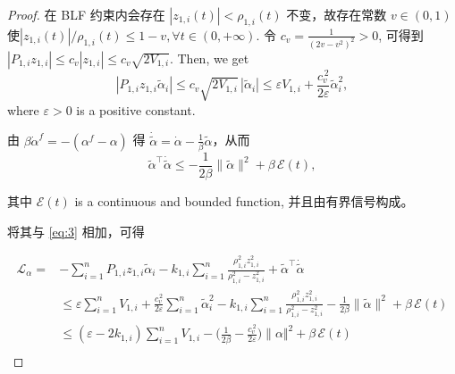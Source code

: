 \documentclass[pdflatex,sn-mathphys-num]{sn-jnl}%
\theoremstyle{thmstyleone}%
\theoremstyle{thmstyletwo}%
\theoremstyle{thmstylethree}%
\begin{document}
\begin{proof}
 
在 BLF 约束内会存在 $|z_{1,i}(t)|<\rho_{1,i}(t)$ 不变，故存在常数 $v\in(0,1)$ 使${|z_{1,i}(t)|}/{\rho_{1,i}(t)}\le 1-v, \forall t \in (0,+\infty)$. 令 $c_v=\frac{1}{(2v-v^2)^2}>0$, 可得到
$
|P_{1,i}z_{1,i}| \le c_v |z_{1,i}|\le c_v \sqrt{2V_{1,i}}
$. Then, we get
$$
|P_{1,i}z_{1,i}\tilde\alpha_i|
\le c_v\sqrt{2V_{1,i}}\,|\tilde\alpha_i|
\le \varepsilon V_{1,i}+\frac{c_v^{\,2}}{2\varepsilon}\tilde\alpha_i^2,
$$
where $\varepsilon>0$ is a positive constant.

由 $\beta\dot\alpha^f=-(\alpha^f-\alpha)$ 得 $\dot{\tilde\alpha}=\dot\alpha-\tfrac{1}{\beta}\tilde\alpha$，从而
$$
\tilde\alpha^\top\dot{\tilde\alpha}
\le -\frac{1}{2\beta}\|\tilde\alpha\|^2+\beta\,\mathcal{E}(t),
$$
 

其中 $\mathcal{E}(t)$ is a continuous and bounded function, 并且由有界信号构成。

将其与 \eqref{eq:3} 相加，可得

\begin{equation}\label{eq:50}
\begin{aligned}
	\mathcal{L}_{\alpha}=&-\sum_{i=1}^nP_{1,i}z_{1,i}\tilde\alpha_i
-k_{1,i}\sum_{i=1}^n\frac{\rho_{1,i}^2 z_{1,i}^2}{\rho_{1,i}^2-z_{1,i}^2}
+\tilde\alpha^\top\dot{\tilde\alpha}\\
& \le
\varepsilon \sum_{i=1}^n V_{1,i}+\frac{c_v^{\,2}}{2\varepsilon}\sum_{i=1}^n \tilde\alpha_i^2-k_{1,i}\sum_{i=1}^n \frac{\rho_{1,i}^2 z_{1,i}^2}{\rho_{1,i}^2-z_{1,i}^2}-\frac{1}{2\beta}\|\tilde\alpha\|^2+\beta\,\mathcal{E}(t)\\
&\le
(\varepsilon-2k_{1,i})\sum_{i=1}^n V_{1,i}
-\Big(\frac{1}{2\beta}-\frac{c_v^{\,2}}{2\varepsilon}\Big)\|\alpha\Vert^2
+\beta\,\mathcal{E}(t)\\
\end{aligned}
\end{equation}



\end{proof}
\end{document}
